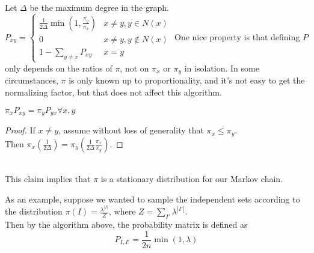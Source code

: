 Let $\Delta$ be the maximum degree in the graph. \\
$P_{xy} = \begin{cases}
\frac{1}{2\Delta}\min(1, \frac{\pi_y}{\pi_x}) & x \neq y, y \in N(x) \\
0 & x \neq y, y \notin N(x) \\
1 - \sum_{y\neq x} P_{xy} & x = y
\end{cases}$
One nice property is that defining $P$ only depends on the ratios of $\pi$, not on $\pi_x$ or $\pi_y$ in isolation. In some circumstances, $\pi$ is only known up to proportionality, and it's not easy to get the normalizing factor, but that does not affect this algorithm.
\begin{claim}
$ \pi_x P_{xy} = \pi_y P_{yx} \forall x, y$
  \end{claim}
\begin{proof}
If $x \neq y$, assume without loss of generality that $\pi_x \leq \pi_y$. \\
  Then $\pi_x(\frac{1}{2\Delta}) = \pi_y(\frac{1}{2\Delta}\frac{\pi_x}{\pi_y})$.
\end{proof} \\
This claim implies that $\pi$ is a stationary distribution for our Markov chain.
\bigskip

As an example, suppose we wanted to sample the independent sets according to the distribution $\pi(I) = \frac{\lambda^{|I|}}{Z}$, where $Z = \sum_{I'} \lambda^{|I'|}$. \\ 
Then by the algorithm above, the probability matrix is defined as
\[ P_{I, I'} = \frac{1}{2n}\min(1, \lambda) \]
